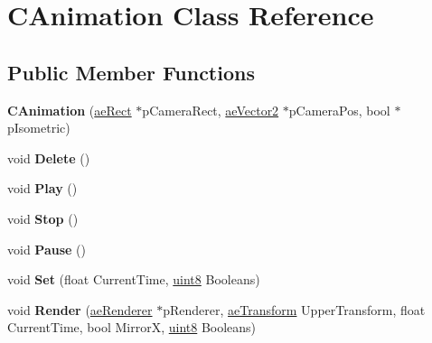 \hypertarget{class_c_animation}{}\section{C\+Animation Class Reference}
\label{class_c_animation}
\subsection*{Public Member Functions}
\begin{DoxyCompactItemize}
\item 
{\bfseries C\+Animation} (\hyperlink{structae_core_1_1ae_rect}{ae\+Rect} $\ast$p\+Camera\+Rect, \hyperlink{structae_core_1_1ae_vector2}{ae\+Vector2} $\ast$p\+Camera\+Pos, bool $\ast$p\+Isometric)\hypertarget{class_c_animation_a529b032bfe42b5ed8aa11196c8e2502e}{}\label{class_c_animation_a529b032bfe42b5ed8aa11196c8e2502e}

\item 
void {\bfseries Delete} ()\hypertarget{class_c_animation_a55b661df0f9c47225e6d31ba9bed5343}{}\label{class_c_animation_a55b661df0f9c47225e6d31ba9bed5343}

\item 
void {\bfseries Play} ()\hypertarget{class_c_animation_ae42e8f48d0ef972df125f9e7f6af572a}{}\label{class_c_animation_ae42e8f48d0ef972df125f9e7f6af572a}

\item 
void {\bfseries Stop} ()\hypertarget{class_c_animation_a0825efd6c38498af6c3a73493c91d973}{}\label{class_c_animation_a0825efd6c38498af6c3a73493c91d973}

\item 
void {\bfseries Pause} ()\hypertarget{class_c_animation_ae3a125b48bc92e51c629674efc275155}{}\label{class_c_animation_ae3a125b48bc92e51c629674efc275155}

\item 
void {\bfseries Set} (float Current\+Time, \hyperlink{namespaceae_core_aa13093dc911869e5b24942552898f01f}{uint8} Booleans)\hypertarget{class_c_animation_ad39c8b208f8a11941a0c595480420a72}{}\label{class_c_animation_ad39c8b208f8a11941a0c595480420a72}

\item 
void {\bfseries Render} (\hyperlink{classae_core_1_1ae_renderer}{ae\+Renderer} $\ast$p\+Renderer, \hyperlink{structae_transform}{ae\+Transform} Upper\+Transform, float Current\+Time, bool MirrorX, \hyperlink{namespaceae_core_aa13093dc911869e5b24942552898f01f}{uint8} Booleans)\hypertarget{class_c_animation_a0e8b47609f48e3d6fb56bf0f7da9145e}{}\label{class_c_animation_a0e8b47609f48e3d6fb56bf0f7da9145e}


\end{DoxyCompactItemize}
